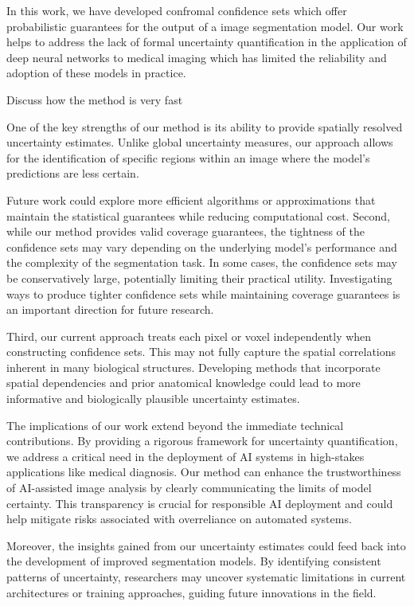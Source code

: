 In this work, we have developed confromal confidence sets which offer probabilistic guarantees for the output of a image segmentation model. Our work helps to address the lack of formal uncertainty quantification in the application of deep neural networks to medical imaging which has limited the reliability and adoption of these models in practice.

Discuss how the method is very fast

One of the key strengths of our method is its ability to provide spatially resolved uncertainty estimates. Unlike global uncertainty measures, our approach allows for the identification of specific regions within an image where the model's predictions are less certain. 

Future work could explore more efficient algorithms or approximations that maintain the statistical guarantees while reducing computational cost.
Second, while our method provides valid coverage guarantees, the tightness of the confidence sets may vary depending on the underlying model's performance and the complexity of the segmentation task. In some cases, the confidence sets may be conservatively large, potentially limiting their practical utility. Investigating ways to produce tighter confidence sets while maintaining coverage guarantees is an important direction for future research.

Third, our current approach treats each pixel or voxel independently when constructing confidence sets. This may not fully capture the spatial correlations inherent in many biological structures. Developing methods that incorporate spatial dependencies and prior anatomical knowledge could lead to more informative and biologically plausible uncertainty estimates.

The implications of our work extend beyond the immediate technical contributions. By providing a rigorous framework for uncertainty quantification, we address a critical need in the deployment of AI systems in high-stakes applications like medical diagnosis. Our method can enhance the trustworthiness of AI-assisted image analysis by clearly communicating the limits of model certainty. This transparency is crucial for responsible AI deployment and could help mitigate risks associated with overreliance on automated systems.

Moreover, the insights gained from our uncertainty estimates could feed back into the development of improved segmentation models. By identifying consistent patterns of uncertainty, researchers may uncover systematic limitations in current architectures or training approaches, guiding future innovations in the field.

